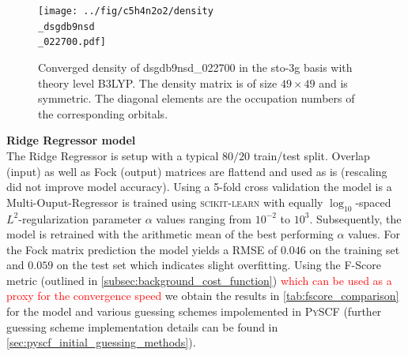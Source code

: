 \begin{figure}[H]
    \centering
    \texttt{[image: ../fig/c5h4n2o2/density\\\_dsgdb9nsd\\\_022700.pdf]}
    \caption[Density matrix of dsgdb9nsd\_022700 in the sto-3g basis with theory level B3LYP]{Converged density of dsgdb9nsd\_022700 in the sto-3g basis with theory level B3LYP. The density matrix is of size $49 \times 49$ and is symmetric. The diagonal elements are the occupation numbers of the corresponding orbitals.}
    \label{fig:density_dsgdb9nsd_022700}
\end{figure}

\textbf{Ridge Regressor model}\\
The Ridge Regressor is setup with a typical $80 / 20$ train/test split. Overlap (input) as well as Fock (output) matrices are flattend and used as is (rescaling did not improve model accuracy). Using a 5-fold cross validation the model is a Multi-Ouput-Regressor is trained using \textsc{scikit-learn} \parencite{ref:sk-learn} with equally $\log_{10}$-spaced $L^2$-regularization parameter $\alpha$ values ranging from $10^{-2}$ to $10^{3}$. Subsequently, the model is retrained with the arithmetic mean of the best performing $\alpha$ values. For the Fock matrix prediction the model yields a RMSE of $0.046$ on the training set and $0.059$ on the test set which indicates slight overfitting. Using the F-Score metric \parencite{ref:Lehtola2019} (outlined in \autoref{subsec:background_cost_function}) \textcolor{red}{which can be used as a proxy for the convergence speed} we obtain the results in \autoref{tab:fscore_comparison} for the model and various guessing schemes impolemented in \textsc{PySCF} (further guessing scheme implementation details can be found in \autoref{sec:pyscf_initial_guessing_methods}).

